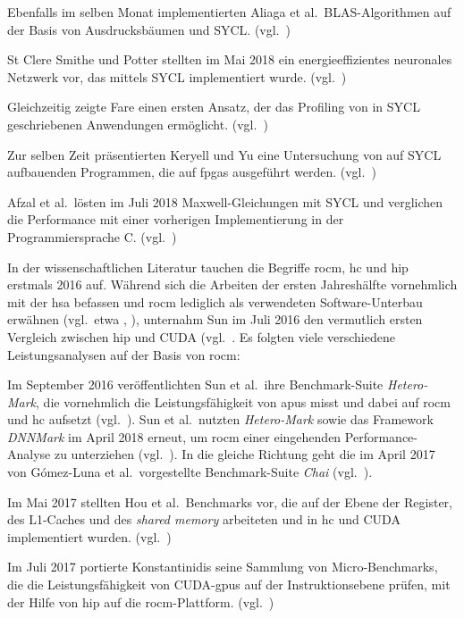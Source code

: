 Ebenfalls im selben Monat implementierten Aliaga et al.\ BLAS-Algorithmen auf
der Basis von Ausdrucksbäumen und SYCL.
(vgl.~\cite{aliaga2017})

St Clere Smithe und Potter stellten im Mai 2018 ein energieeffizientes
neuronales Netzwerk vor, das mittels SYCL implementiert wurde.
(vgl.~\cite{stcleresmithe2018})

Gleichzeitig zeigte Fare einen ersten Ansatz, der das Profiling von in SYCL
geschriebenen Anwendungen ermöglicht.
(vgl.~\cite{fare2018})

Zur selben Zeit präsentierten Keryell und Yu eine Untersuchung von
auf SYCL aufbauenden Programmen, die auf \gls{fpga}s ausgeführt werden.
(vgl.~\cite{keryell2018})

Afzal et al.\ lösten im Juli 2018 Maxwell-Gleichungen mit SYCL und verglichen
die Performance mit einer vorherigen Implementierung in der Programmiersprache
C.
(vgl.~\cite{afzal2018})

In der wissenschaftlichen Literatur tauchen die Begriffe \gls{rocm}, \gls{hc}
und \gls{hip} erstmals 2016 auf. Während sich die Arbeiten der ersten
Jahreshälfte vornehmlich mit der \gls{hsa} befassen und \gls{rocm} lediglich als
verwendeten Software-Unterbau erwähnen (vgl.\ etwa \cite{li2016},
\cite{larsson2016}), unternahm Sun im Juli 2016 den vermutlich ersten Vergleich
zwischen \gls{hip} und CUDA (vgl.~\cite{sun2016}. Es folgten viele verschiedene
Leistungsanalysen auf der Basis von \gls{rocm}:

Im September 2016 veröffentlichten Sun et al.\ ihre Benchmark-Suite
\textit{Hetero-Mark}, die vornehmlich die Leistungsfähigkeit von \gls{apu}s
misst und dabei auf \gls{rocm} und \gls{hc} aufsetzt (vgl.~\cite{sunyifan2016}).
Sun et al.\ nutzten \textit{Hetero-Mark} sowie das Framework \textit{DNNMark} im
April 2018 erneut, um \gls{rocm} einer eingehenden Performance-Analyse zu
unterziehen (vgl.~\cite{sun2018}). In die gleiche Richtung geht die im April
2017 von Gómez-Luna et al.\ vorgestellte Benchmark-Suite \textit{Chai}
(vgl.~\cite{gomezluna2017}). 

Im Mai 2017 stellten Hou et al.\ Benchmarks vor, die auf der Ebene der Register,
des L1-Caches und des \textit{shared memory} arbeiteten und in \gls{hc} und
CUDA implementiert wurden. (vgl.~\cite{hou2017})

Im Juli 2017 portierte Konstantinidis seine Sammlung von Micro-Benchmarks, die
die Leistungsfähigkeit von CUDA-\gls{gpu}s auf der Instruktionsebene prüfen,
mit der Hilfe von \gls{hip} auf die \gls{rocm}-Plattform.
(vgl.~\cite{konstantinidis2017})

